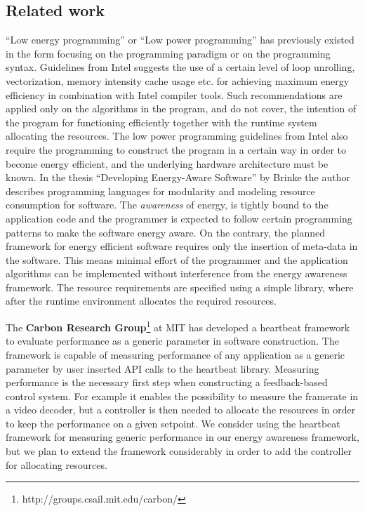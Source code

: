 \documentclass{article}
\begin{document}
\subsection{Related work}
``Low energy programming'' or ``Low power programming'' has previously existed in the form focusing on the programming paradigm or on the programming syntax. 
Guidelines from Intel \cite{IntelLowPower} suggests the use of a certain level of loop unrolling, vectorization, memory intensity cache usage etc.
for achieving maximum energy efficiency in combination with Intel compiler tools. 
Such recommendations are applied only on the algorithms in the program, and do not cover, the intention of the program for functioning efficiently together with the runtime system allocating the resources. 
The low power programming guidelines from Intel also require the programming to construct the program in a certain way in order to become energy efficient, 
and the underlying hardware architecture must be known. 
In the thesis ``Developing Energy-Aware Software'' by Brinke \cite{Brinke:15} the author describes programming languages for modularity and modeling resource consumption for software.
The \textit{awareness} of energy, is tightly bound to the application code and the programmer is expected to follow certain programming patterns to make the software energy aware.
On the contrary, the planned framework for energy efficient software requires only the insertion of meta-data in the software.
This means minimal effort of the programmer and the application algorithms can be implemented without interference from the energy awareness framework.
The resource requirements are specified using a simple library, where after the runtime environment allocates the required resources.\smallskip

The \textbf{Carbon Research Group}\footnote{http://groups.csail.mit.edu/carbon/} at MIT has developed a heartbeat framework to evaluate performance as a generic parameter in software construction.
The framework is capable of measuring performance of any application as a generic parameter by user inserted API calls to the heartbeat library. 
Measuring performance is the necessary first step when constructing a feedback-based control system. 
For example it enables the possibility to measure the framerate in a video decoder, but a controller is then needed to allocate the resources in order to keep the performance on a given setpoint. 
We consider using the heartbeat framework for measuring generic performance in our energy awareness framework, 
but we plan to extend the framework considerably in order to add the controller for allocating resources.\smallskip
\end{document}
